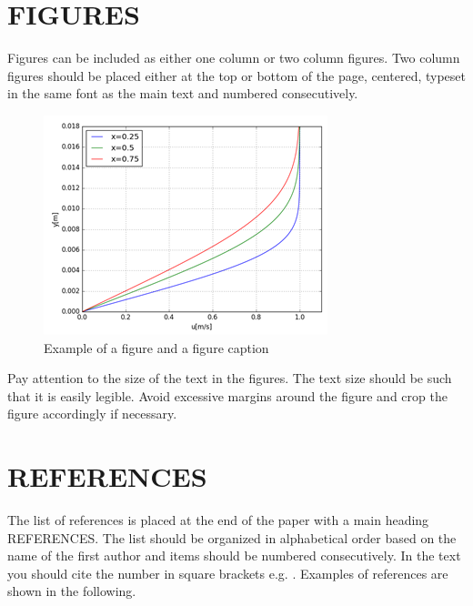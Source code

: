 \documentclass[a4paper, english, 9pt,twocolumn]{extarticle} %
\renewcommand\_[2][1]{\ifmmode _{\textnormal{\scalebox{#1}{#2}}}\else\underscore#2\fi} %
\renewcommand\^[2][1]{\ifmmode ^{\textnormal{\scalebox{#1}{#2}}}\else\xor#2\fi} %
\begin{document}
\section*{FIGURES}
Figures can be included as either one column or two column figures. Two column figures should be placed either at the top or bottom of the page, centered, typeset in the same font as the main text and numbered consecutively.

\begin{figure}
    \includegraphics[width = \columnwidth]{cfm_test.png}
    \caption{Example of a figure and a figure caption} %
    \label{fig:ExampleFigure}
\end{figure}

Pay attention to the size of the text in the figures. The text size should be such that it is easily legible. Avoid excessive margins around the figure and crop the figure accordingly if necessary.

\section*{REFERENCES}
The list of references is placed at the end of the paper with a main heading REFERENCES. The list should be organized in alphabetical order based on the name of the first author and items should be numbered consecutively. In the text you should cite the number in square brackets e.g. \cite{Hanninen2016, Tu2012}. %
Examples of references are shown in the following.

\printbibliography[title={REFERENCES}] %
\end{document}
